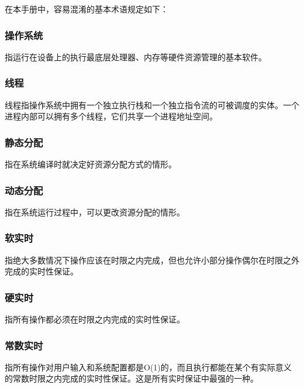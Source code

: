 在本手册中，容易混淆的基本术语规定如下：

\subsubsection{操作系统}\label{subsubsec:operating-system}

指运行在设备上的执行最底层处理器、内存等硬件资源管理的基本软件。

\subsubsection{线程}\label{subsubsec:thread}

线程指操作系统中拥有一个独立执行栈和一个独立指令流的可被调度的实体。一个进程内部可以拥有多个线程，它们共享一个进程地址空间。

\subsubsection{静态分配}\label{subsubsec:static-allocation}

指在系统编译时就决定好资源分配方式的情形。

\subsubsection{动态分配}\label{subsubsec:dynamic-allocation}

指在系统运行过程中，可以更改资源分配的情形。

\subsubsection{软实时}\label{subsubsec:soft-real-time}

指绝大多数情况下操作应该在时限之内完成，但也允许小部分操作偶尔在时限之外完成的实时性保证。

\subsubsection{硬实时}\label{subsubsec:hard-real-time}

指所有操作都必须在时限之内完成的实时性保证。

\subsubsection{常数实时}\label{subsubsec:constant-real-time}

指所有操作对用户输入和系统配置都是O(1)的，而且执行都能在某个有实际意义的常数时限之内完成的实时性保证。这是所有实时保证中最强的一种。

